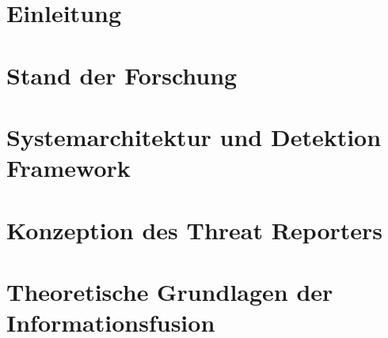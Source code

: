 \documentclass[]{thesisclass}
\begin{document}
\clearpage



\setcounter{page}{1}



\newpage

\chapter{Einleitung}
    
    
    

\newpage

\chapter{Stand der Forschung}
\label{sec:related_work}
	

\newpage

\chapter{Systemarchitektur und Detektion Framework}
\label{chapter:systemarchitektur}
    
    
    

\newpage

\chapter{Konzeption des Threat Reporters}
\label{chapter:thread_report}
	

\newpage

\chapter{Theoretische Grundlagen der Informationsfusion}
\label{chapter:theoretische_grundlagen_der_informationsfusion}
    
\end{document}
